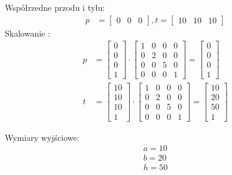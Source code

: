\documentclass[a4paper]{article}
\begin{document}
\noindent Współrzedne przodu i tyłu:
\begin{align*}
p &= 
\left[
\begin{matrix}
0 & 0 & 0 
\end{matrix}
\right] ,
t = 
\left[
\begin{matrix}
10 & 10 & 10 
\end{matrix}
\right]
\end{align*}
Skalowanie :
\begin{align}
p &= 
\left[
\begin{matrix}
0 \\ 0 \\ 0 \\ 1
\end{matrix}
\right] \cdot 
\left[
\begin{matrix}
1 & 0 & 0 & 0\\
0 & 2 & 0 & 0\\
0 & 0 & 5 & 0\\
0 & 0 & 0 & 1
\end{matrix}
\right] =
\left[
\begin{matrix}
0 \\ 0 \\ 0 \\ 1
\end{matrix}
\right] \\
t &= 
\left[
\begin{matrix}
10 \\ 10 \\ 10 \\ 1
\end{matrix}
\right] \cdot 
\left[
\begin{matrix}
1 & 0 & 0 & 0\\
0 & 2 & 0 & 0\\
0 & 0 & 5 & 0\\
0 & 0 & 0 & 1
\end{matrix}
\right] =
\left[
\begin{matrix}
10 \\ 20 \\ 50 \\ 1
\end{matrix}
\right] 
\end{align}

\noindent Wymiary wyjściowe:
\begin{align}
a = 10 \\
b = 20 \\
h = 50 
\end{align}
\end{document}
